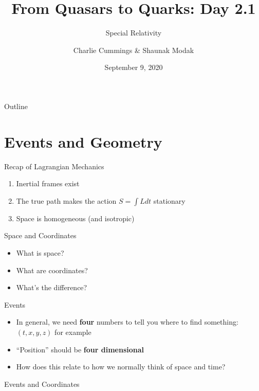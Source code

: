 \documentclass[10pt,xcolor={table,dvipsnames},t]{beamer}
\title[Your Short Title]{From Quasars to Quarks: Day 2.1}
\subtitle{Special Relativity}
\author{Charlie Cummings \& Shaunak Modak}
\institute{tinyurl.com/FQ2Q-relativity}
\date{September 9, 2020}
\begin{document}
\begin{frame}
    \titlepage
\end{frame}

\begin{frame}{Outline}
    \tableofcontents
\end{frame}

\section{Events and Geometry}
\begin{frame}{Recap of Lagrangian Mechanics}
    \begin{enumerate}
        \item Inertial frames exist
        \item The true path makes the action $S = \int L dt$ stationary
        \item Space is homogeneous (and isotropic)
    \end{enumerate}
\end{frame}

\begin{frame}{Space and Coordinates}
\begin{itemize}
    \item What is space?
    \item What are coordinates?
    \item What's the difference?
\end{itemize}
\end{frame}

\begin{frame}{Events}
\begin{itemize}
    \item In general, we need \textbf{four} numbers to tell you where to find something: $(t,x,y,z)$ for example
    \item ``Position'' should be \textbf{four dimensional}
    \item How does this relate to how we normally think of space and time?
\end{itemize}
    
\end{frame}

\begin{frame}{Events and Coordinates}
\vfill
\begin{figure}[H]
    \centering
    \label{fig:1D}
\end{figure}
\end{frame}
\end{document}
